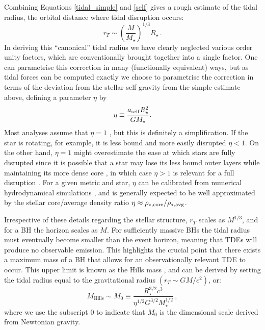 \documentclass[
    reprint,
    prd,
    nofootinbib,
    amsmath,amssymb,
    aps,
    floatfix,
]{revtex4-2}
\begin{document}
Combining Equations \ref{tidal_simple} and \ref{self} gives a rough estimate of the tidal radius, the orbital distance where tidal disruption occurs:
\begin{equation}
    r_{T} \sim \left( \frac{M}{M_{\star}} \right)^{1/3} R_{\star}  \, .
    \label{eq:tidal_radius}
\end{equation}
{In deriving this ``canonical'' tidal radius we have clearly neglected various order unity factors, which are conventionally brought together into a single factor. One can parametrise this correction in many (functionally equivalent) ways, but as tidal forces can be computed exactly we choose to parametrise the correction in terms of the deviation from the stellar self gravity from the simple estimate above,  defining a parameter $\eta$ by }
\begin{equation}
    \eta \equiv {a_{\rm self} R_\star^2 \over G M_\star}. 
\end{equation}
{Most analyses assume that $\eta = 1$ \citep[e.g.][]{Kesden12, MumBalb20b}, but this is definitely a simplification. If the star is rotating, for example, it is less bound and more easily disrupted $\eta < 1$. On the other hand, $\eta = 1$  might overestimate the ease at which stars are fully disrupted since it is possible that a star may lose its less bound outer layers while maintaining its more dense core \citep{Ryu20}, in which case $\eta > 1$ is relevant for a full disruption \citep[e.g.,][]{Phinney89}.
For a given metric and star, $\eta$ can be calibrated from numerical hydrodynamical simulations \citep[e.g.,][]{Guillochon13}, and is generally expected to be well approximated by the stellar core/average density ratio  $\eta \approx \rho_{\star, \rm core}/ \rho_{\star, \rm avg}$.  }

{Irrespective of these details regarding the stellar structure,} $r_{T}$ scales as $M^{1/3}$, and for a BH the horizon scales as $M$. For sufficiently massive BHs the tidal radius must eventually become smaller than the event horizon, meaning that TDEs will produce no observable emission. This highlights the crucial point that there exists a maximum mass of a BH that allows for an observationally relevant TDE to occur. This upper limit is known as the Hills mass \cite{Hills1975}, and can be derived by setting the tidal radius equal to the gravitational radius $(r_{T}\sim GM/c^{2})$, or:
\begin{equation}
    M_{\text{Hills}} \sim M_{0} \equiv \frac{R_{\star}^{3/2} c^3}{\eta^{1/2} G^{3/2} M_{\star}^{1/2}} \, ,
\end{equation}
where we use the subscript $0$ to indicate that $M_{0}$ is the dimensional scale derived from Newtonian gravity.
\end{document}
